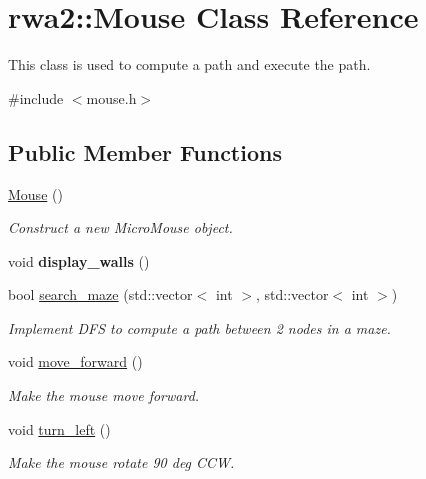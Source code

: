 \hypertarget{classrwa2_1_1_mouse}{}\section{rwa2\+:\+:Mouse Class Reference}
\label{classrwa2_1_1_mouse}


This class is used to compute a path and execute the path.  




{\ttfamily \#include $<$mouse.\+h$>$}

\subsection*{Public Member Functions}
\begin{DoxyCompactItemize}
\item 
\hyperlink{classrwa2_1_1_mouse_a048dffae3aaa3a6ddc2c6cc4741a097c}{Mouse} ()
\begin{DoxyCompactList}\small\item\em Construct a new Micro\+Mouse object. \end{DoxyCompactList}\item 
\mbox{\label{classrwa2_1_1_mouse_abbcc99c41fd073426fdfd790f947956e}} 
void {\bfseries display\+\_\+walls} ()
\item 
bool \hyperlink{classrwa2_1_1_mouse_a4b441e30f6c9d446b901f9b21ba104df}{search\+\_\+maze} (std\+::vector$<$ int $>$, std\+::vector$<$ int $>$)
\begin{DoxyCompactList}\small\item\em Implement D\+FS to compute a path between 2 nodes in a maze. \end{DoxyCompactList}\item 
\mbox{\label{classrwa2_1_1_mouse_afc6e0d56e3a777c05efa3929eb256e0a}} 
void \hyperlink{classrwa2_1_1_mouse_afc6e0d56e3a777c05efa3929eb256e0a}{move\+\_\+forward} ()
\begin{DoxyCompactList}\small\item\em Make the mouse move forward. \end{DoxyCompactList}\item 
\mbox{\label{classrwa2_1_1_mouse_a5748e94e740432c334d15364fb476919}} 
void \hyperlink{classrwa2_1_1_mouse_a5748e94e740432c334d15364fb476919}{turn\+\_\+left} ()
\begin{DoxyCompactList}\small\item\em Make the mouse rotate 90 deg C\+CW. \end{DoxyCompactList}\item 

\end{DoxyCompactItemize}
